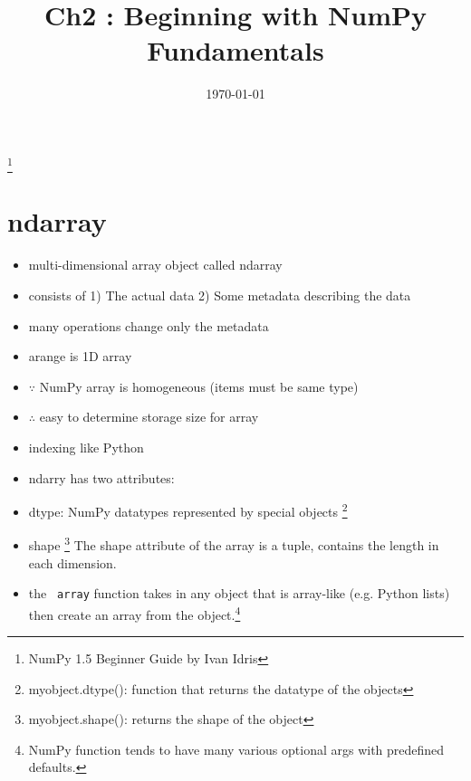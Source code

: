 \documentclass[12 pt , twoside, letterpaper] {article}
\begin{document}
\title{Ch2 : Beginning with NumPy Fundamentals} 
\date {\today}
\maketitle
\footnote{NumPy 1.5 Beginner Guide by Ivan Idris}
\section{ndarray}
\begin{itemize}
\item multi-dimensional array object called ndarray
\item  consists of 1) The actual data
2) Some metadata describing the data
\item many operations change only the metadata 
\item arange is 1D array 
\item $\because$ NumPy array is homogeneous (items must be same type)
\item $\therefore$ easy to determine storage size for array 
\item indexing like Python 
\item ndarry has two attributes:
\item dtype: NumPy datatypes represented by special objects \footnote{ myobject.dtype(): function that returns the datatype of the objects}
\item shape \footnote{myobject.shape(): returns the shape of the object}
The shape attribute of the array is a tuple,  contains the length in 
each dimension.
\item the \verb! array! function takes in any object that is array-like (e.g. Python lists) then create an array from the object.\footnote{NumPy function tends to have many various optional args with predefined defaults.}


\end{itemize}
\end{document}

